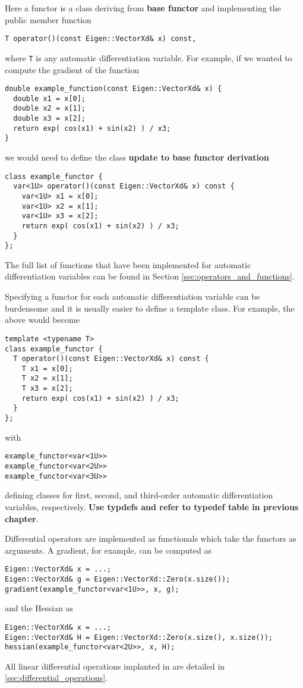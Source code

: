Here a functor is a class deriving from \textbf{base functor} and implementing
the public member function
%
\begin{verbatim}
T operator()(const Eigen::VectorXd& x) const,
\end{verbatim}
%
where \verb|T| is any automatic differentiation variable.  For example,
if we wanted to compute the gradient of the function
%
\begin{verbatim}
double example_function(const Eigen::VectorXd& x) {
  double x1 = x[0];
  double x2 = x[1];
  double x3 = x[2];
  return exp( cos(x1) + sin(x2) ) / x3;
}
\end{verbatim}
%
we would need to define the class \textbf{update to base functor derivation}
%
\begin{verbatim}
class example_functor {
  var<1U> operator()(const Eigen::VectorXd& x) const {
    var<1U> x1 = x[0];
    var<1U> x2 = x[1];
    var<1U> x3 = x[2];
    return exp( cos(x1) + sin(x2) ) / x3;
  }
};
\end{verbatim}
%
The full list of functions that have been implemented for automatic
differentiation variables can be found in Section \ref{sec:operators_and_functions}.

Specifying a functor for each automatic differentiation variable can be
burdensome and it is usually easier to define a template class.  For
example, the above would become
%
\begin{verbatim}
template <typename T>
class example_functor {
  T operator()(const Eigen::VectorXd& x) const {
    T x1 = x[0];
    T x2 = x[1];
    T x3 = x[2];
    return exp( cos(x1) + sin(x2) ) / x3;
  }
};
\end{verbatim}
%
with
%
\begin{verbatim}
example_functor<var<1U>>
example_functor<var<2U>>
example_functor<var<3U>>
\end{verbatim}
%
defining classes for first, second, and third-order automatic differentiation
variables, respectively.  \textbf{Use typdefs and refer to typedef table 
in previous chapter}.

Differential operators are implemented as functionals which take
the functors as arguments.  A gradient, for example, can be computed
as
%
\begin{verbatim}
Eigen::VectorXd& x = ...;
Eigen::VectorXd& g = Eigen::VectorXd::Zero(x.size());
gradient(example_functor<var<1U>>, x, g);
\end{verbatim}
%
and the Hessian as
%
\begin{verbatim}
Eigen::VectorXd& x = ...;
Eigen::VectorXd& H = Eigen::VectorXd::Zero(x.size(), x.size());
hessian(example_functor<var<2U>>, x, H);
\end{verbatim}
%
All linear differential operations implanted in \nomad are detailed in \ref{sec:differential_operations}.

